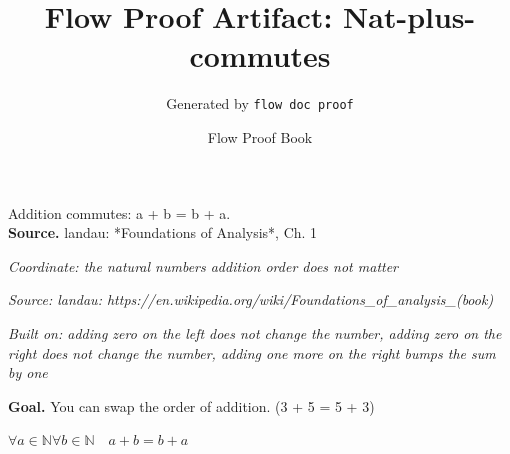 \documentclass[11pt]{article}
\title{Flow Proof Artifact: Nat-plus-commutes}
\author{Generated by \texttt{flow doc proof}}
\date{Flow Proof Book}
\theoremstyle{definition}
\begin{document}
\maketitle
Addition commutes: a + b = b + a.\\[0.5em]
\textbf{Source.} landau: *Foundations of Analysis*, Ch. 1\\[0.5em]
\bigskip
{}\par
\smallskip\noindent\textit{Coordinate: the natural numbers \cdot addition \cdot order does not matter}\par
\smallskip\noindent\textit{Source: landau: https://en.wikipedia.org/wiki/Foundations\_of\_analysis\_(book)}\par
\smallskip\noindent\textit{Built on: adding zero on the left does not change the number, adding zero on the right does not change the number, adding one more on the right bumps the sum by one}\par
\medskip
\noindent\textbf{Goal.} You can swap the order of addition.  (3 + 5 = 5 + 3)\par
\noindent$\displaystyle \forall a \in \mathbb{N} \forall b \in \mathbb{N}\quad a + b = b + a$\par
\medskip
\noindent
\end{document}
